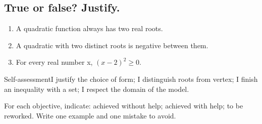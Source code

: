 \subsection*{True or false? Justify.}\label{C02-VF}
\begin{enumerate}
\item A quadratic function always has two real roots.
\item A quadratic with two distinct roots is negative between them.
\item For every real number x, $(x-2)^2\geq0$.
\end{enumerate}
\begin{repere}{Self-assessment}I justify the choice of form; I distinguish roots from vertex; I finish an inequality with a set; I respect the domain of the model.

For each objective, indicate: achieved without help; achieved with help; to be reworked. Write one example and one mistake to avoid.\end{repere}
\endgroup
\ifprof\fi
